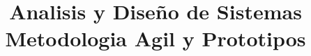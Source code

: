 \documentclass[letterpaper,12pt]{article} %
\newcommand{\myMateria}{Analisis y Diseño de Sistemas}
\newcommand{\MyReport}{Metodologia Agil y Prototipos}
\begin{document}
    
    \newpage
    \tableofcontents
    \newpage

\title{\myMateria \\\textbf{\MyReport} \\ } 

\author{ \normalsize{\texttt{\myName}} }
\date{\myDate}
\maketitle



\nocite{*}



\centering\vspace*{\fill} 
\end{document}
